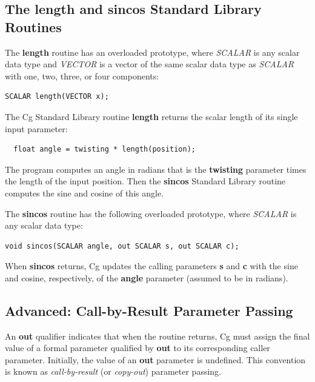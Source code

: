 \documentclass{book}
\begin{document}
\subsection*{The length and sincos Standard Library Routines}

The \textbf{length} routine has an overloaded prototype, where \textit{SCALAR} is any scalar data type and \textit{VECTOR} is a vector of the same scalar data type as \textit{SCALAR} with one, two, three, or four components:

\FloatBarrier
\begin{lstlisting}
SCALAR length(VECTOR x);
\end{lstlisting}
\FloatBarrier

The Cg Standard Library routine \textbf{length} returns the scalar length of its single input parameter:

\FloatBarrier
\begin{lstlisting}
  float angle = twisting * length(position);
\end{lstlisting}
\FloatBarrier

The program computes an angle in radians that is the \textbf{twisting} parameter times the length of the input position. Then the \textbf{sincos} Standard Library routine computes the sine and cosine of this angle.

The \textbf{sincos} routine has the following overloaded prototype, where \textit{SCALAR} is any scalar data type:

\FloatBarrier
\begin{lstlisting}
void sincos(SCALAR angle, out SCALAR s, out SCALAR c);
\end{lstlisting}
\FloatBarrier

When \textbf{sincos} returns, Cg updates the calling parameters \textbf{s} and \textbf{c} with the sine and cosine, respectively, of the \textbf{angle} parameter (assumed to be in radians).

\subsection*{Advanced: Call-by-Result Parameter Passing}

An \textbf{out} qualifier indicates that when the routine returns, Cg must assign the final value of a formal parameter qualified by \textbf{out} to its corresponding caller parameter. Initially, the value of an \textbf{out} parameter is undefined. This convention is known as \textit{call-by-result} (or \textit{copy-out}) parameter passing.
\end{document}
